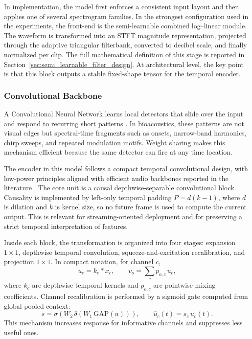 \documentclass[a4paper,singleside,12pt]{report} %
\begin{document}
	In implementation, the model first enforces a consistent input layout and then applies one of several spectrogram families. In the strongest configuration used in the experiments, the front-end is the semi-learnable combined log--linear module. The waveform is transformed into an STFT magnitude representation, projected through the adaptive triangular filterbank, converted to decibel scale, and finally normalized per clip. The full mathematical definition of this stage is reported in Section~\ref{sec:semi_learnable_filter_design}. At architectural level, the key point is that this block outputs a stable fixed-shape tensor for the temporal encoder.

	\subsubsection{Convolutional Backbone}
	A Convolutional Neural Network learns local detectors that slide over the input and respond to recurring short patterns \cite{lecun1998cnn}. In bioacoustics, these patterns are not visual edges but spectral-time fragments such as onsets, narrow-band harmonics, chirp sweeps, and repeated modulation motifs. Weight sharing makes this mechanism efficient because the same detector can fire at any time location.

	The encoder in this model follows a compact temporal convolutional design, with low-power principles aligned with efficient audio backbones reported in the literature \cite{matchboxnet2020,phinets2022}. The core unit is a causal depthwise-separable convolutional block. Causality is implemented by left-only temporal padding \(P=d(k-1)\), where \(d\) is dilation and \(k\) is kernel size, so no future frame is used to compute the current output. This is relevant for streaming-oriented deployment and for preserving a strict temporal interpretation of features.

		Inside each block, the transformation is organized into four stages: expansion \(1\times1\), depthwise temporal convolution, squeeze-and-excitation recalibration, and projection \(1\times1\). In compact notation, for channel \(c\),
	\begin{equation}
		u_c = k_c * x_c, \qquad
		v_o = \sum_c p_{o,c}\,u_c,
	\end{equation}
	where \(k_c\) are depthwise temporal kernels and \(p_{o,c}\) are pointwise mixing coefficients. Channel recalibration is performed by a sigmoid gate computed from global pooled context:
	\begin{equation}
		s=\sigma\!\left(W_2\,\delta(W_1\,\mathrm{GAP}(u))\right), \qquad \hat{u}_c(t)=s_c\,u_c(t).
	\end{equation}
	This mechanism increases response for informative channels and suppresses less useful ones.
\end{document}
